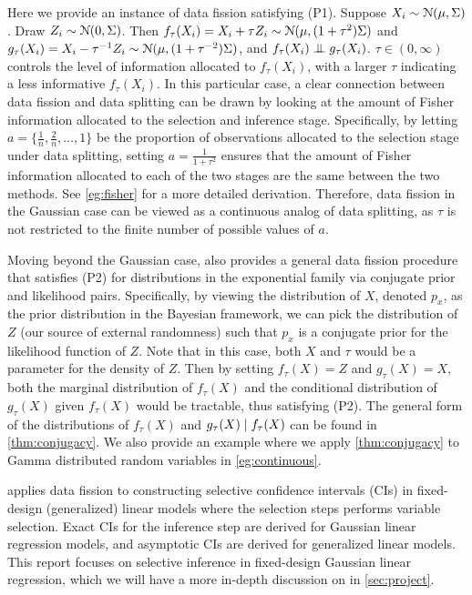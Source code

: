 Here we provide an instance of data fission satisfying (P1). Suppose $X_i\sim \mathcal{N}(\mu, \Sigma)$. Draw $Z_i\sim\mathcal{N}(0,\Sigma)$. Then $f_\tau(X_i) = X_i + \tau Z_i \sim \mathcal{N}(\mu, (1+\tau^2)\Sigma)$ and $g_\tau(X_i) = X_i-\tau^{-1}Z_i \sim \mathcal{N}(\mu, (1+\tau^{-2})\Sigma)$, and $f_\tau(X_i) \indep g_\tau(X_i)$. $\tau\in(0,\infty)$ controls the level of information allocated to $f_\tau(X_i)$, with a larger $\tau$ indicating a less informative $f_\tau(X_i)$. In this particular case, a clear connection between data fission and data splitting can be drawn by looking at the amount of Fisher information allocated to the selection and inference stage. Specifically, by letting $a=\{\frac{1}{n}, \frac{2}{n}, \dots, 1\}$ be the proportion of observations allocated to the selection stage under data splitting, setting $a=\frac{1}{1+\tau^2}$ ensures that the amount of Fisher information allocated to each of the two stages are the same between the two methods. See \cref{eg:fisher} for a more detailed derivation. Therefore, data fission in the Gaussian case can be viewed as a continuous analog of data splitting, as $\tau$ is not restricted to the finite number of possible values of $a$.

Moving beyond the Gaussian case, \cite{leiner2022data} also provides a general data fission procedure that satisfies (P2) for distributions in the exponential family via conjugate prior and likelihood pairs. Specifically, by viewing the distribution of $X$, denoted $p_x$, as the prior distribution in the Bayesian framework, we can pick the distribution of $Z$ (our source of external randomness) such that $p_x$ is a conjugate prior for the likelihood function of $Z$. Note that in this case, both $X$ and $\tau$ would be a parameter for the density of $Z$. Then by setting $f_\tau(X)=Z$ and $g_\tau(X)=X$, both the marginal distribution of $f_\tau(X)$ and the conditional distribution of $g_\tau(X)$ given $f_\tau(X)$ would be tractable, thus satisfying (P2). The general form of the distributions of $f_\tau(X)$ and $g_\tau(X)\mid f_\tau(X)$ can be found in \cref{thm:conjugacy}. We also provide an example where we apply \cref{thm:conjugacy} to Gamma distributed random variables in \cref{eg:continuous}.

\cite{leiner2022data} applies data fission to constructing selective confidence intervals (CIs) in fixed-design (generalized) linear models where the selection steps performs variable selection. Exact CIs for the inference step are derived for Gaussian linear regression models, and asymptotic CIs are derived for generalized linear models. This report focuses on selective inference in fixed-design Gaussian linear regression, which we will have a more in-depth discussion on in \cref{sec:project}.